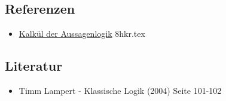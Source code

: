 \documentclass{sajzk}
\begin{document}
\subsection{Referenzen}
\begin{itemize}
    \item \href{8hkr.pdf}{Kalkül der Aussagenlogik} 8hkr.tex
\end{itemize}

\subsection{Literatur}
\begin{itemize}
    \item Timm Lampert - Klassische Logik (2004) Seite 101-102
\end{itemize}
\end{document}
